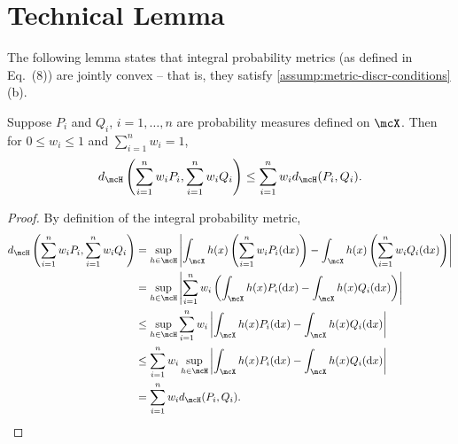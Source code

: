 \section{Technical Lemma}


The following lemma states that integral probability metrics (as defined in Eq.\ (8)) are jointly convex -- that is, they satisfy \cref{assump:metric-discr-conditions}(b).
\begin{lemma}\label{lem:ipm-joint-convex}
	Suppose $P_i$ and $Q_i$, $i = 1,\ldots, n$ are probability measures defined on $\mcX$. Then for $0\leq w_i \leq 1$ and $\sum_{i = 1}^n w_i = 1$,
	\[
		d_{\mcH}\left(\sum_{i=1}^{n}w_i P_i, \sum_{i=1}^{n}w_i Q_i\right)
		\le \sum_{i=1}^{n}w_i  	d_{\mcH} (P_i, Q_i).
	\]

\end{lemma}

\begin{proof}
	By definition of the integral probability metric,
	\begin{align}
		{d_{\mcH}\left(\sum_{i=1}^{n}w_i P_i, \sum_{i=1}^{n}w_iQ_i\right)}
		 & =  \sup_{h \in \mcH}\left\vert \int_{\mcX} h(x) \left(\sum_{i=1}^{n}w_i P_i(\dee x)\right) - \int_{\mcX} h(x)\left(\sum_{i=1}^{n}w_i Q_i(\dee x)\right)\right\vert  \nonumber \\
		 & = \sup_{h \in \mcH}\left\vert \sum_{i=1}^{n}w_i \left(\int_{\mcX} h(x)  P_i(\dee x) - \int_{\mcX} h(x) Q_i(\dee x) \right)\right\vert\nonumber                                \\
		 & \le  \sup_{h \in \mcH} \sum_{i=1}^{n}w_i \left\vert  \int_{\mcX} h(x) P_i(\dee x) - \int_{\mcX} h(x) Q_i(\dee x) \right\vert \nonumber                                        \\
		 & \le \sum_{i=1}^{n}w_i  \sup_{h \in \mcH} \left\vert  \int_{\mcX} h(x) P_i(\dee x) - \int_{\mcX} h(x) Q_i(\dee x) \right\vert  \nonumber                                       \\
		 & = \sum_{i=1}^{n}w_i  d_{\mcH} (P_i, Q_i).
	\end{align}
\end{proof}

